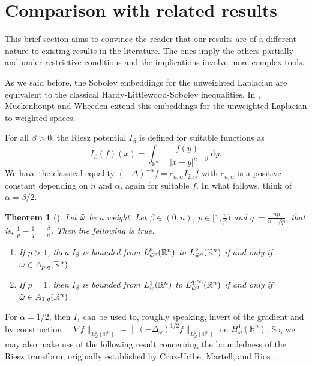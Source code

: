 \documentclass[12pt, letterpaper]{amsart}
\newtheorem{thm}{Theorem}[section]
\theoremstyle{definition}
\theoremstyle{remark}
\numberwithin{equation}{section}
\begin{document}
{\section{Comparison with related results}

This brief section aims to convince the reader that our results are of a different nature to existing results in the literature. The ones imply the others partially and under restrictive conditions {and  the implications involve more complex tools.}

As we said before, the Sobolev embeddings for the unweighted Laplacian are equivalent to the classical Hardy-Littlewood-Sobolev inequalities. In \cite{muckenhoupt1974weighted}, Muckenhoupt and Wheeden extend this embeddings for the unweighted Laplacian to weighted spaces.

For all $\beta>0$, the Riesz potential $I_\beta$ is defined for suitable functions as 
\begin{equation*}
    I_\beta(f)(x) =\int_{\mathbb{R}^n} \frac{f(y)}{ \ \ |x-y|^{n-\beta }} \ \mathrm{d}y.
\end{equation*}
We have the classical equality $(-\Delta)^{-\alpha}f=c_{n,\alpha}I_{2\alpha} f$ with $c_{n,\alpha}$ is a positive constant depending on $n$ and $\alpha$, again for suitable $f$. In what follows, think of $\alpha=\beta/2$.
\begin{thm}[\cite{muckenhoupt1974weighted}]\label{thm:MW}
    Let $\Tilde{\omega}$ be a weight. Let $\beta \in (0,n)$, $p \in [1,\frac{n}{\beta})$ and $q:=\frac{np}{n-\beta p}$, that is, $\frac{1}{p}-\frac{1}{q}=\frac{\beta}{n}$. Then the following is true.
    \begin{enumerate}
        \item If $p>1$, then $I_\beta$ is bounded from $L^p_{\Tilde{w}^p}(\mathbb{R}^n)$ to $L^q_{\Tilde{w}^q}(\mathbb{R}^n)$ if and only if $\Tilde{\omega} \in A_{p,q}(\mathbb{R}^n)$.
        \item If $p=1$, then $I_\beta$ is bounded from $L^1_{\Tilde{w}}(\mathbb{R}^n)$ to $L^{q,\infty}_{\Tilde{w}^q}(\mathbb{R}^n)$ if and only if $\Tilde{\omega} \in A_{1,q}(\mathbb{R}^n)$.
    \end{enumerate}
\end{thm}

For $\alpha=1/2$, then $I_1$ can be used  to, roughly speaking, invert of the gradient and by construction $\| \nabla f \|_{L^2_\omega(\mathbb{R}^n)}= \| (-\Delta_\omega )^{1/2 } f \|_{L^2_\omega(\mathbb{R}^n)}$
on $H^1_\omega(\mathbb{R}^n)$. So, we may
 also make use of the following result concerning the boundedness of the Riesz transform, originally established by Cruz-Uribe, Martell, and Rios \cite{cruz2017kato}. 

}
\end{document}
